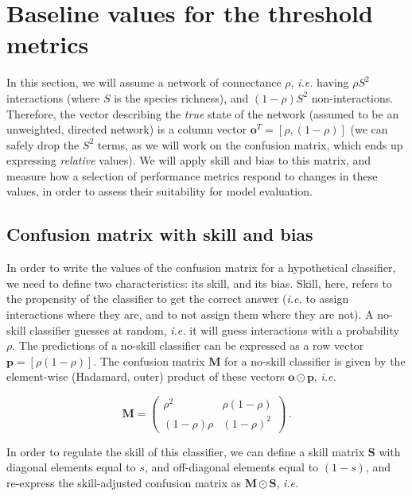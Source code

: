 \documentclass[10pt,oneside]{article}
\begin{document}
\hypertarget{baseline-values-for-the-threshold-metrics}{%
\section{Baseline values for the threshold
metrics}\label{baseline-values-for-the-threshold-metrics}}

In this section, we will assume a network of connectance \(\rho\),
\emph{i.e.} having \(\rho S^2\) interactions (where \(S\) is the species
richness), and \((1-\rho) S^2\) non-interactions. Therefore, the vector
describing the \emph{true} state of the network (assumed to be an
unweighted, directed network) is a column vector
\(\mathbf{o}^T = [\rho, (1-\rho)]\) (we can safely drop the \(S^2\)
terms, as we will work on the confusion matrix, which ends up expressing
\emph{relative} values). We will apply skill and bias to this matrix,
and measure how a selection of performance metrics respond to changes in
these values, in order to assess their suitability for model evaluation.

\hypertarget{confusion-matrix-with-skill-and-bias}{%
\subsection{Confusion matrix with skill and
bias}\label{confusion-matrix-with-skill-and-bias}}

In order to write the values of the confusion matrix for a hypothetical
classifier, we need to define two characteristics: its skill, and its
bias. Skill, here, refers to the propensity of the classifier to get the
correct answer (\emph{i.e.} to assign interactions where they are, and
to not assign them where they are not). A no-skill classifier guesses at
random, \emph{i.e.} it will guess interactions with a probability
\(\rho\). The predictions of a no-skill classifier can be expressed as a
row vector \(\mathbf{p} = [\rho (1-\rho)]\). The confusion matrix
\(\mathbf{M}\) for a no-skill classifier is given by the element-wise
(Hadamard, outer) product of these vectors
\(\mathbf{o} \odot \mathbf{p}\), \emph{i.e.}

\[
\mathbf{M} = \begin{pmatrix}
    \rho^2 & \rho (1-\rho) \\
    (1-\rho) \rho & (1-\rho)^2
\end{pmatrix} \,.
\]

In order to regulate the skill of this classifier, we can define a skill
matrix \(\mathbf{S}\) with diagonal elements equal to \(s\), and
off-diagonal elements equal to \((1-s)\), and re-express the
skill-adjusted confusion matrix as \(\mathbf{M} \odot \mathbf{S}\),
\emph{i.e.}
\end{document}
